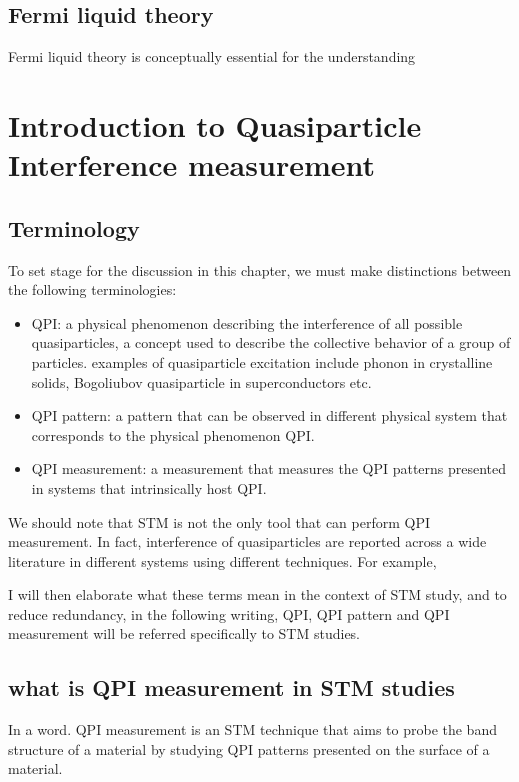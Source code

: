 \subsection{Fermi liquid theory}
Fermi liquid theory is conceptually essential for the understanding


\section{Introduction to Quasiparticle Interference measurement}

\subsection{Terminology}
To set stage for the discussion in this chapter, we must make distinctions between the following terminologies: 
\begin{itemize}
	\item \ac{QPI}: a physical phenomenon describing the interference of all possible quasiparticles, a concept used to describe the collective behavior of a group of particles. examples of quasiparticle excitation include phonon in crystalline solids, Bogoliubov quasiparticle in superconductors etc. 
	\item QPI pattern: a pattern that can be observed in different physical system that corresponds to the physical phenomenon QPI.
	\item QPI measurement: a measurement that measures the QPI patterns presented in systems that intrinsically host QPI.
\end{itemize}
We should note that STM is not the only tool that can perform QPI measurement. In fact, interference of quasiparticles are reported across a wide literature in different systems using different techniques. For example,

I will then elaborate what these terms mean in the context of STM study, and to reduce redundancy, in the following writing, QPI, QPI pattern and QPI measurement will be referred specifically to STM studies.

\subsection{what is QPI measurement in STM studies}
In a word. QPI measurement is an STM technique that aims to probe the band structure of a material by studying QPI patterns presented on the surface of a material. 

